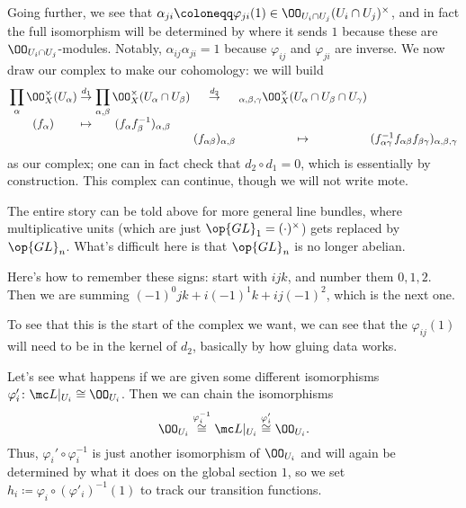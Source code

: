 \documentclass[../notes.tex]{subfiles}
\begin{document}
Going further, we see that $\alpha_{ji}\coloneqq\varphi_{ji}(1)\in\OO_{U_i\cap U_j}(U_i\cap U_j)^\times$, and in fact the full isomorphism will be determined by where it sends $1$ because these are $\OO_{U_i\cap U_j}$-modules. Notably, $\alpha_{ij}\alpha_{ji}=1$ because $\varphi_{ij}$ and $\varphi_{ji}$ are inverse. We now draw our complex to make our cohomology: we will build
\begin{equation}
	\arraycolsep=1.4pt\begin{array}{ccccccccc}
		\displaystyle\prod_{\alpha}\OO_X^\times(U_\alpha) &\stackrel{d_1}\to& \displaystyle\prod_{\alpha,\beta}\OO_X^\times(U_\alpha\cap U_\beta) &\stackrel{d_2}\to& \displaystyle_{\alpha,\beta,\gamma}\OO_X^\times(U_\alpha\cap U_\beta\cap U_\gamma) \\
		(f_\alpha) &\mapsto& (f_\alpha f_\beta^{-1})_{\alpha,\beta} \\
		&&& (f_{\alpha\beta})_{\alpha,\beta} &\mapsto& (f_{\alpha\gamma}^{-1}f_{\alpha\beta}f_{\beta\gamma})_{\alpha,\beta,\gamma}
	\end{array} \label{eq:cech-complex-dim-1}
\end{equation}
as our complex; one can in fact check that $d_2\circ d_1=0$, which is essentially by construction. This complex can continue, though we will not write mote.
\begin{remark}
	The entire story can be told above for more general line bundles, where multiplicative units (which are just $\op{GL}_1=(\cdot)^\times$) gets replaced by $\op{GL}_n$. What's difficult here is that $\op{GL}_n$ is no longer abelian.
\end{remark}
\begin{remark}
	Here's how to remember these signs: start with $ijk$, and number them $0,1,2$. Then we are summing $(-1)^0jk+i(-1)^1k+ij(-1)^2$, which is the next one.
\end{remark}
\begin{remark}
	To see that this is the start of the complex we want, we can see that the $\varphi_{ij}(1)$ will need to be in the kernel of $d_2$, basically by how gluing data works.
\end{remark}
Let's see what happens if we are given some different isomorphisms $\varphi'_i\colon\mc L|_{U_i}\cong\OO_{U_i}$. Then we can chain the isomorphisms
\[\OO_{U_i}\stackrel{\varphi_i^{-1}}\cong\mc L|_{U_i}\stackrel{\varphi_i'}\cong\OO_{U_i}.\]
Thus, $\varphi_i'\circ\varphi_i^{-1}$ is just another isomorphism of $\OO_{U_i}$ and will again be determined by what it does on the global section $1$, so we set $h_i\coloneqq\varphi_i\circ(\varphi'_i)^{-1}(1)$ to track our transition functions.
\end{document}

